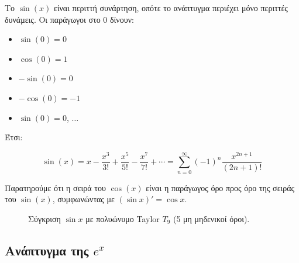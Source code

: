 Το \(\sin(x)\) είναι περιττή συνάρτηση, οπότε το ανάπτυγμα περιέχει μόνο
περιττές δυνάμεις. Οι παράγωγοι στο \(0\) δίνουν:

\begin{itemize}
\tightlist
\item
  \(\sin(0)=0\)
\item
  \(\cos(0)=1\)
\item
  \(-\sin(0)=0\)
\item
  \(-\cos(0)=-1\)
\item
  \(\sin(0)=0\), \(\dots\)
\end{itemize}

Έτσι:

\[
\sin(x) = x - \frac{x^3}{3!} + \frac{x^5}{5!} - \frac{x^7}{7!} + \cdots = \sum_{n=0}^{\infty} (-1)^n \frac{x^{2n+1}}{(2n+1)!}
\]

Παρατηρούμε ότι η σειρά του \(\cos(x)\) είναι η παράγωγος όρο προς όρο
της σειράς του \(\sin(x)\), συμφωνώντας με \((\sin x)' = \cos x\).

\begin{figure}[htbp]
\centering
{}
\caption{Σύγκριση $\sin x$ με πολυώνυμο Taylor $T_9$ (5 μη μηδενικοί όροι).}
\label{fig:sintaylor}
\end{figure}

\subsection{\texorpdfstring{Ανάπτυγμα της
\(e^x\)}{Ανάπτυγμα της e\^{}x}}\label{ux3b1ux3bdux3acux3c0ux3c4ux3c5ux3b3ux3bcux3b1-ux3c4ux3b7ux3c2-ex}

